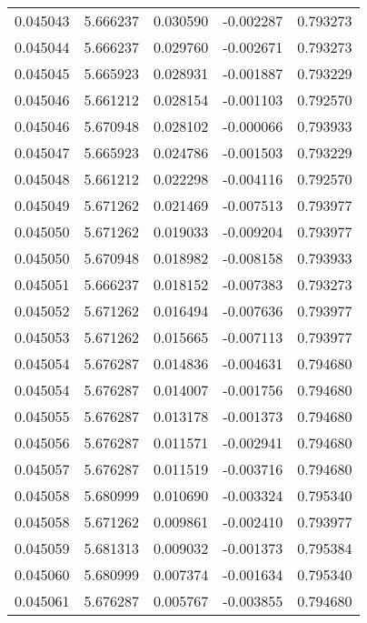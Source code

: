 \begin{tabular}{lrrrr}
0.045043    &  5.666237 &  0.030590 & -0.002287 &             0.793273 \\
0.045044    &  5.666237 &  0.029760 & -0.002671 &             0.793273 \\
0.045045    &  5.665923 &  0.028931 & -0.001887 &             0.793229 \\
0.045046    &  5.661212 &  0.028154 & -0.001103 &             0.792570 \\
0.045046    &  5.670948 &  0.028102 & -0.000066 &             0.793933 \\
0.045047    &  5.665923 &  0.024786 & -0.001503 &             0.793229 \\
0.045048    &  5.661212 &  0.022298 & -0.004116 &             0.792570 \\
0.045049    &  5.671262 &  0.021469 & -0.007513 &             0.793977 \\
0.045050    &  5.671262 &  0.019033 & -0.009204 &             0.793977 \\
0.045050    &  5.670948 &  0.018982 & -0.008158 &             0.793933 \\
0.045051    &  5.666237 &  0.018152 & -0.007383 &             0.793273 \\
0.045052    &  5.671262 &  0.016494 & -0.007636 &             0.793977 \\
0.045053    &  5.671262 &  0.015665 & -0.007113 &             0.793977 \\
0.045054    &  5.676287 &  0.014836 & -0.004631 &             0.794680 \\
0.045054    &  5.676287 &  0.014007 & -0.001756 &             0.794680 \\
0.045055    &  5.676287 &  0.013178 & -0.001373 &             0.794680 \\
0.045056    &  5.676287 &  0.011571 & -0.002941 &             0.794680 \\
0.045057    &  5.676287 &  0.011519 & -0.003716 &             0.794680 \\
0.045058    &  5.680999 &  0.010690 & -0.003324 &             0.795340 \\
0.045058    &  5.671262 &  0.009861 & -0.002410 &             0.793977 \\
0.045059    &  5.681313 &  0.009032 & -0.001373 &             0.795384 \\
0.045060    &  5.680999 &  0.007374 & -0.001634 &             0.795340 \\
0.045061    &  5.676287 &  0.005767 & -0.003855 &             0.794680 \\

\end{tabular}
